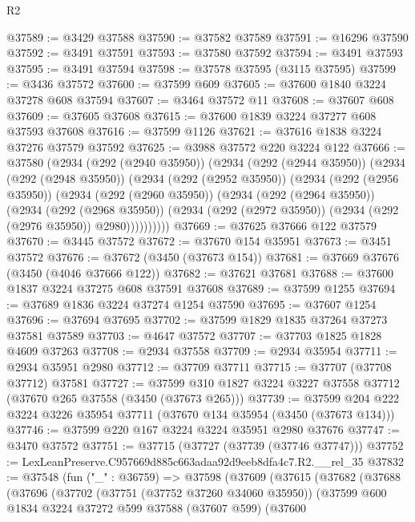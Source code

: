 \begin{lexlean}{R2}
\begin{coremodule}
@37589 := @3429 @37588
@37590 := @37582 @37589
@37591 := @16296 @37590
@37592 := @3491 @37591
@37593 := @37580 @37592
@37594 := @3491 @37593
@37595 := @3491 @37594
@37598 := @37578 @37595 (@3115 @37595)
@37599 := @3436 @37572
@37600 := @37599 @609
@37605 := @37600 @1840 @3224 @37278 @608 @37594
@37607 := @3464 @37572 @11
@37608 := @37607 @608
@37609 := @37605 @37608
@37615 := @37600 @1839 @3224 @37277 @608 @37593 @37608
@37616 := @37599 @1126
@37621 := @37616 @1838 @3224 @37276 @37579 @37592
@37625 := @3988 @37572 @220 @3224 @122
@37666 := @37580
    (@2934
      (@292 (@2940 @35950))
      (@2934
        (@292 (@2944 @35950))
        (@2934
          (@292 (@2948 @35950))
          (@2934
            (@292 (@2952 @35950))
            (@2934
              (@292 (@2956 @35950))
              (@2934
                (@292 (@2960 @35950))
                (@2934
                  (@292 (@2964 @35950))
                  (@2934
                    (@292 (@2968 @35950))
                    (@2934 (@292 (@2972 @35950)) (@2934 (@292 (@2976 @35950)) @2980))))))))))
@37669 := @37625 @37666 @122 @37579
@37670 := @3445 @37572
@37672 := @37670 @154 @35951
@37673 := @3451 @37572
@37676 := @37672 (@3450 (@37673 @154))
@37681 := @37669 @37676 (@3450 (@4046 @37666 @122))
@37682 := @37621 @37681
@37688 := @37600 @1837 @3224 @37275 @608 @37591 @37608
@37689 := @37599 @1255
@37694 := @37689 @1836 @3224 @37274 @1254 @37590
@37695 := @37607 @1254
@37696 := @37694 @37695
@37702 := @37599 @1829 @1835 @37264 @37273 @37581 @37589
@37703 := @4647 @37572
@37707 := @37703 @1825 @1828 @4609 @37263
@37708 := @2934 @37558
@37709 := @2934 @35954
@37711 := @2934 @35951 @2980
@37712 := @37709 @37711
@37715 := @37707 (@37708 @37712) @37581
@37727 := @37599 @310 @1827 @3224 @3227 @37558 @37712 (@37670 @265 @37558 (@3450 (@37673 @265)))
@37739 := @37599 @204 @222 @3224 @3226 @35954 @37711 (@37670 @134 @35954 (@3450 (@37673 @134)))
@37746 := @37599 @220 @167 @3224 @3224 @35951 @2980 @37676
@37747 := @3470 @37572
@37751 := @37715 (@37727 (@37739 (@37746 @37747)))
@37752 := LexLeanPreserve.C957669d885c663adaa92d9eeb8dfa4c7.R2.__rel_35
@37832 := @37548
    (fun ("_" : @36759) =>
    @37598
      (@37609
        (@37615
          (@37682
            (@37688
              (@37696
                (@37702
                  (@37751 (@37752 @37260 @34060 @35950))
                  (@37599
                    @600
                    @1834
                    @3224
                    @37272
                    @599
                    @37588
                    (@37607 @599)
                    (@37600

\end{coremodule}
\end{lexlean}
